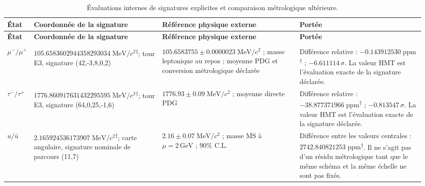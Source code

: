 \begingroup
\setlength{\tabcolsep}{4.5pt}
\renewcommand{\arraystretch}{1.28}
\begin{longtable}{@{}>{\raggedright\arraybackslash}p{}>{\raggedright\arraybackslash}p{}>{\raggedright\arraybackslash}p{}>{\raggedright\arraybackslash}p{}@{}}
\caption{Évaluations internes de signatures explicites et comparaison métrologique ultérieure.}\label{tab:masas-evaluaciones-firmas-explicitas}\\
\toprule
\textbf{État} & \textbf{Coordonnée de la signature} & \textbf{Référence physique externe} & \textbf{Portée} \\
\midrule
\endfirsthead
\toprule
\textbf{État} & \textbf{Coordonnée de la signature} & \textbf{Référence physique externe} & \textbf{Portée} \\
\midrule
\endhead
\midrule
\multicolumn{4}{r}{\footnotesize Suite à la page suivante.}\\
\endfoot
\bottomrule
\endlastfoot
$\mu^-/\mu^+$ & $105.658360\allowbreak{}294435\allowbreak{}829303\allowbreak{}4\;\mathrm{MeV}/c^2$\textsuperscript{\(\dagger\)}; tour E3, signature (42,-3,8,0,2) & $105.6583755\pm0.0000023\;\mathrm{MeV}/c^2$ ; masse leptonique au repos ; moyenne PDG et conversion métrologique déclarée & Différence relative : $-0.143912\allowbreak{}530\;\mathrm{ppm}$\textsuperscript{\(\dagger\)} ; $-6.611114\,\sigma$. La valeur HMT est l’évaluation exacte de la signature déclarée. \\
$\tau^-/\tau^+$ & $1776.860917\allowbreak{}631432\allowbreak{}295595\;\mathrm{MeV}/c^2$\textsuperscript{\(\dagger\)}; tour E3, signature (64,0,25,-1,6) & $1776.93\pm0.09\;\mathrm{MeV}/c^2$ ; moyenne directe PDG & Différence relative : $-38.877371\allowbreak{}966\;\mathrm{ppm}$\textsuperscript{\(\dagger\)} ; $-0.813547\,\sigma$. La valeur HMT est l’évaluation exacte de la signature déclarée. \\
$u/\bar u$ & $2.165924\allowbreak{}536173\allowbreak{}907\;\mathrm{MeV}/c^2$\textsuperscript{\(\dagger\)}; carte angulaire, signature nominale de parcours (11,7) & $2.16\pm0.07\;\mathrm{MeV}/c^2$ ; masse $\overline{\mathrm{MS}}$ à $\mu=2\,\mathrm{GeV}$ ; 90\% C.L. & Différence entre les valeurs centrales : $2742.840821\allowbreak{}253\;\mathrm{ppm}$\textsuperscript{\(\dagger\)}. Il ne s’agit pas d’un résidu métrologique tant que le même schéma et la même échelle ne sont pas fixés. \\

\end{longtable}
